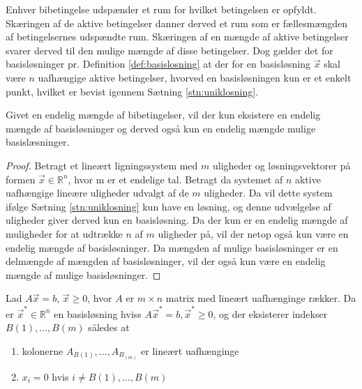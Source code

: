 Enhver bibetingelse udspænder et rum for hvilket betingelsen er opfyldt. Skæringen af de aktive betingelser danner derved et rum som er fællesmængden af betingelsernes udspændte rum. Skæringen af en mængde af aktive betingelser svarer derved til den mulige mængde af disse betingelser. Dog gælder det for basisløsninger pr. Definition \ref{def:basislosning} at der for en basisløsning $\vec{x}$ skal være $n$ uafhængige aktive betingelser, hvorved en basisløsningen kun er et enkelt punkt, hvilket er bevist igennem Sætning \ref{stn:uniklosning}. 

\begin{kor}
Givet en endelig mængde af bibetingelser, vil der kun eksistere en endelig mængde af basisløsninger og derved også kun en endelig mængde mulige basislæsninger.
\end{kor}

\begin{proof}
Betragt et lineært ligningssystem med $m$ uligheder og løsningsvektorer på formen $\vec{x} \in \mathds{R}^n$, hvor m er et endelige tal.
	Betragt da systemet af $n$ aktive uafhængige lineære uligheder udvalgt af de $m$ uligheder. Da vil dette system ifølge Sætning \ref{stn:uniklosning} kun have en løsning, og denne udvælgelse af uligheder giver derved kun en basisløsning. Da der kun er en endelig mængde af muligheder for at udtrække $n$ af $m$ uligheder på, vil der netop også kun være en endelig mængde af basisløsninger. Da mængden af mulige basisløsninger er en delmængde af mængden af basisløsninger, vil der også kun være en endelig mængde af mulige basisløsninger.
\end{proof}

\begin{stn}
Lad $A\vec{x}=b$, $\vec{x}\geq 0$, hvor $A$ er $m\times n$ matrix med lineært uafhænginge rækker. Da er $\vec{x}^*\in \mathds{R}^n$ en basisløsning hviss $A\vec{x}^*=b, \vec{x}^* \geq 0$, og der eksisterer indekser $B(1), ..., B(m)$ således at
\begin{enumerate}[label=(\alph*)]
\item kolonerne $A_{B(1)}, ..., A_{B_(m)}$ er lineært uafhænginge
\item $x_i = 0$ hvis $i \neq B(1),...,B(m)$
\end{enumerate}
\end{stn}

